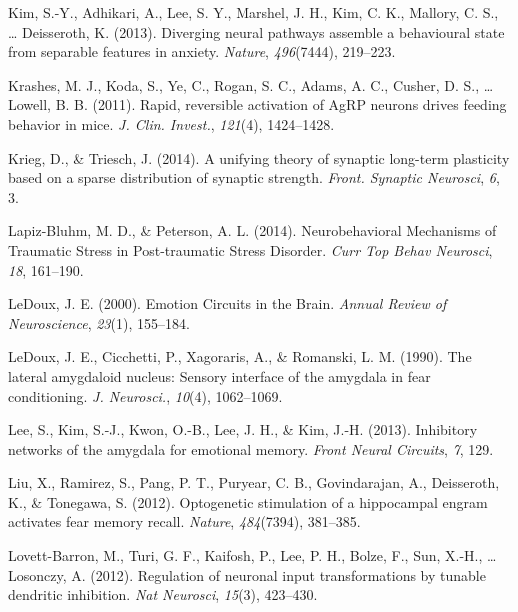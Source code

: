 \documentclass[12pt,a4paperpaper,]{report}
\begin{document}
\hypertarget{ref-kimux5fdivergingux5f2013-1}{}
Kim, S.-Y., Adhikari, A., Lee, S. Y., Marshel, J. H., Kim, C. K.,
Mallory, C. S., \ldots{} Deisseroth, K. (2013). Diverging neural
pathways assemble a behavioural state from separable features in
anxiety. \emph{Nature}, \emph{496}(7444), 219--223.

\hypertarget{ref-krashesux5frapidux5f2011}{}
Krashes, M. J., Koda, S., Ye, C., Rogan, S. C., Adams, A. C., Cusher, D.
S., \ldots{} Lowell, B. B. (2011). Rapid, reversible activation of AgRP
neurons drives feeding behavior in mice. \emph{J. Clin. Invest.},
\emph{121}(4), 1424--1428.

\hypertarget{ref-kriegux5funifyingux5f2014-1}{}
Krieg, D., \& Triesch, J. (2014). A unifying theory of synaptic
long-term plasticity based on a sparse distribution of synaptic
strength. \emph{Front. Synaptic Neurosci}, \emph{6}, 3.

\hypertarget{ref-lapiz-bluhmux5fneurobehavioralux5f2014}{}
Lapiz-Bluhm, M. D., \& Peterson, A. L. (2014). Neurobehavioral
Mechanisms of Traumatic Stress in Post-traumatic Stress Disorder.
\emph{Curr Top Behav Neurosci}, \emph{18}, 161--190.

\hypertarget{ref-ledouxux5femotionux5f2000-1}{}
LeDoux, J. E. (2000). Emotion Circuits in the Brain. \emph{Annual Review
of Neuroscience}, \emph{23}(1), 155--184.

\hypertarget{ref-ledouxux5flateralux5f1990}{}
LeDoux, J. E., Cicchetti, P., Xagoraris, A., \& Romanski, L. M. (1990).
The lateral amygdaloid nucleus: Sensory interface of the amygdala in
fear conditioning. \emph{J. Neurosci.}, \emph{10}(4), 1062--1069.

\hypertarget{ref-leeux5finhibitoryux5f2013}{}
Lee, S., Kim, S.-J., Kwon, O.-B., Lee, J. H., \& Kim, J.-H. (2013).
Inhibitory networks of the amygdala for emotional memory. \emph{Front
Neural Circuits}, \emph{7}, 129.

\hypertarget{ref-liuux5foptogeneticux5f2012}{}
Liu, X., Ramirez, S., Pang, P. T., Puryear, C. B., Govindarajan, A.,
Deisseroth, K., \& Tonegawa, S. (2012). Optogenetic stimulation of a
hippocampal engram activates fear memory recall. \emph{Nature},
\emph{484}(7394), 381--385.

\hypertarget{ref-lovett-barronux5fregulationux5f2012}{}
Lovett-Barron, M., Turi, G. F., Kaifosh, P., Lee, P. H., Bolze, F., Sun,
X.-H., \ldots{} Losonczy, A. (2012). Regulation of neuronal input
transformations by tunable dendritic inhibition. \emph{Nat Neurosci},
\emph{15}(3), 423--430.
\end{document}
